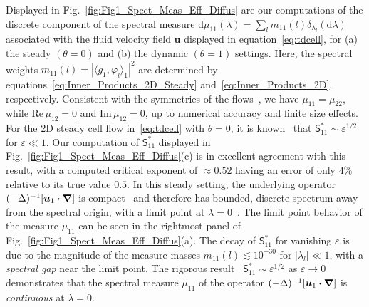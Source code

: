 \documentclass[leqno,onefignum,onetabnum]{siamltex1213}
\newcommand{\figref}[1]{Fig.~\ref{#1}}
\renewcommand{\d}{\mathrm{d}}
\newcommand\Real{\mbox{Re}\,} %
\newcommand\Imag{\mbox{Im}\,} %
\newcommand{\Sm}{\mathsf{S}}
\newcommand\bnabla{\mbox{\boldmath${\nabla}$}}
\providecommand\bcdot{\boldsymbol{\cdot}}
\newcommand{\vecu}{\boldsymbol{u}}
\begin{document}
Displayed in \figref{fig:Fig1_Spect_Meas_Eff_Diffus} are our
computations of the discrete component of the spectral measure
$\d\mu_{11}(\lambda)=\sum_lm_{11}(l)\delta_{\lambda_l}(\d\lambda)$ associated with the fluid
velocity field $\vecu$ displayed in equation~\eqref{eq:tdcell}, for (a)
the steady $(\theta=0)$ and (b) the dynamic $(\theta=1)$ settings. Here, the
spectral weights $m_{11}(l)=|\langle g_1,\varphi_l\rangle_1|^2$ are determined by
equations~\eqref{eq:Inner_Products_2D_Steady}
and~\eqref{eq:Inner_Products_2D}, respectively.  Consistent with the
symmetries of the flows~\cite{Biferale:PF:2725}, we have
$\mu_{11}=\mu_{22}$, while $\Real\mu_{12}=0$ and $\Imag\mu_{12}=0$, up to
numerical accuracy and finite size effects. For the 2D steady cell
flow in~\eqref{eq:tdcell} with $\theta=0$, it is
known~\cite{Fannjiang:1994:SIAM_JAM:333} that
$\Sm^*_{11}\sim\varepsilon^{1/2}$ for $\varepsilon\ll1$. Our computation of $\Sm^*_{11}$
displayed in \figref{fig:Fig1_Spect_Meas_Eff_Diffus}(c) is in
excellent agreement with this result, with a computed critical
exponent of $\approx0.52$ having an error of only $4\%$ relative to its true
value $0.5$. In this steady setting, the underlying operator
$(-\Delta)^{-1}[\vecu_1\bcdot\bnabla]$ is
compact~\cite{Bhattacharya:AAP:1999:951} and therefore has 
bounded, discrete spectrum away from the spectral origin, with a limit
point at $\lambda=0$~\cite{Stakgold:BVP:2000}. The limit point behavior of  
the measure $\mu_{11}$ can be seen in the rightmost panel of
\figref{fig:Fig1_Spect_Meas_Eff_Diffus}(a). The decay of $\Sm^*_{11}$
for vanishing $\varepsilon$ is due to the magnitude of the measure masses
$m_{11}(l)\lesssim10^{-30}$ for $|\lambda_l|\ll1$, with a \emph{spectral gap} near
the limit point. The rigorous
result~\cite{Fannjiang:1994:SIAM_JAM:333} $\Sm^*_{11}\sim\varepsilon^{1/2}$ as
$\varepsilon\to0$ demonstrates that the spectral measure $\mu_{11}$ of the operator
$(-\Delta)^{-1}[\vecu_1\bcdot\bnabla]$ is \emph{continuous} at $\lambda=0$. 
\end{document}
